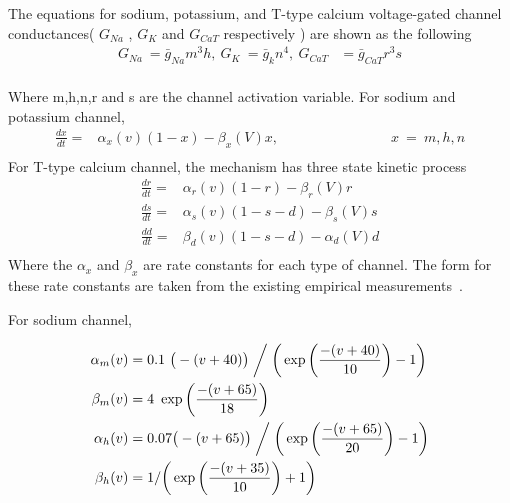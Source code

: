 The equations for sodium, potassium, and T-type calcium voltage-gated channel conductances( $G_{Na}$ , $G_{K}$ and $G_{CaT}$ respectively ) are shown as the following
\begin{align*} 
G_{Na}\ =\bar{g}_{Na}m^{3}h ,\: G_{K}\ =\bar{g}_{k}n^{4},\: G_{CaT}&=\bar{g}_{CaT} r^{3}s\\
\end{align*}

Where m,h,n,r and s are the channel activation variable. 
For sodium and potassium channel,
\begin{align*}
\frac{dx}{dt} =&\alpha_{x}(v)(1-x) - \beta_{x}(V)x, \hspace{8em}  x\ =\ m,h,n \\
\end{align*}
For T-type calcium channel, the mechanism has three state kinetic process
\begin{align*}
\frac{dr}{dt} =& \alpha_{r}(v)(1-r) - \beta_r(V)r \\
\frac{ds}{dt} =& \alpha_{s}(v)(1-s-d) - \beta_{s}(V)s \\
\frac{d d}{dt} =& \beta_{d}(v)(1-s-d) - \alpha_d(V)d \\
\end{align*}
Where the $\alpha_x$ and $\beta_x$ are rate constants for each type of channel. The form for these rate constants are taken from the existing empirical
 measurements~\cite{hodgkin1952quantitative, carnevale2006neuron, wang1991model}.

For sodium channel, %

\begin{align*} 
\alpha_{m}(v) &= 0.1\  \big(-(v+40)\big)  \biggm/  \bigg( \exp \bigg( \frac{-(v+40)}{10} \bigg) - 1 \bigg)\\
\beta_{m}(v) &= 4\ \exp \bigg(\frac{-(v+65)}{18}\bigg)\\
\alpha_{h}(v) &= 0.07\big(-(v+65)\big)  \biggm/  \bigg( \exp \bigg( \frac{-(v+65)}{20} \bigg) - 1 \bigg)\\
\beta_{h}(v) &= 1 / \bigg( \exp \bigg(\frac{-(v+35)}{10}\bigg) + 1 \bigg)\\
\end{align*}

